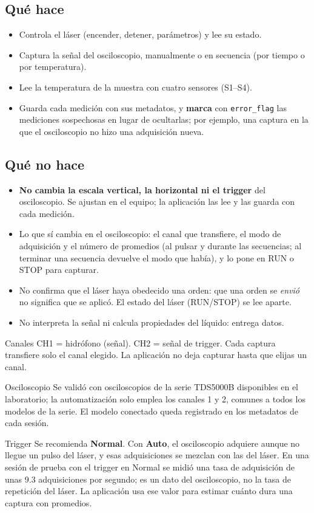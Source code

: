 \documentclass[11pt]{article}
\newcommand{\btn}[1]{\btnbox{#1}}
\newcommand{\cod}[1]{\texttt{#1}}
\begin{document}
\subsection*{Qué hace}
\begin{itemize}
  \item Controla el láser (encender, detener, parámetros) y lee su estado.
  \item Captura la señal del osciloscopio, manualmente o en secuencia (por tiempo o por temperatura).
  \item Lee la temperatura de la muestra con cuatro sensores (S1--S4).
  \item Guarda cada medición con sus metadatos, y \textbf{marca} con \cod{error\_flag} las mediciones sospechosas en lugar de ocultarlas; por ejemplo, una captura en la que el osciloscopio no hizo una adquisición nueva.
\end{itemize}
\subsection*{Qué no hace}
\begin{itemize}
  \item \textbf{No cambia la escala vertical, la horizontal ni el trigger} del osciloscopio. Se ajustan en el equipo; la aplicación las lee y las guarda con cada medición.
  \item Lo que sí cambia en el osciloscopio: el canal que transfiere, el modo de adquisición y el número de promedios (al pulsar \btn{Aplicar parámetros} y durante las secuencias; al terminar una secuencia devuelve el modo que había), y lo pone en RUN o STOP para capturar.
  \item No confirma que el láser haya obedecido una orden: que una orden se \textit{envió} no significa que se aplicó. El estado del láser (RUN/STOP) se lee aparte.
  \item No interpreta la señal ni calcula propiedades del líquido: entrega datos.
\end{itemize}
\begin{nota}{Canales}
CH1 = hidrófono (señal). CH2 = señal de trigger. Cada captura transfiere solo el canal elegido. La aplicación no deja capturar hasta que elijas un canal.
\end{nota}
\begin{nota}{Osciloscopio}
Se validó con osciloscopios de la serie TDS5000B disponibles en el laboratorio; la automatización solo emplea los canales 1 y 2, comunes a todos los modelos de la serie. El modelo conectado queda registrado en los metadatos de cada sesión.
\end{nota}
\begin{nota}{Trigger}
Se recomienda \textbf{Normal}. Con \textbf{Auto}, el osciloscopio adquiere aunque no llegue un pulso del láser, y esas adquisiciones se mezclan con las del láser. En una sesión de prueba con el trigger en Normal se midió una tasa de adquisición de unas 9.3 adquisiciones por segundo; es un dato del osciloscopio, no la tasa de repetición del láser. La aplicación usa ese valor para estimar cuánto dura una captura con promedios.
\end{nota}
\end{document}
